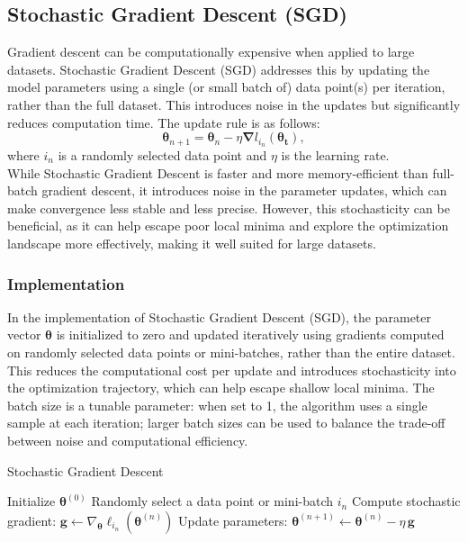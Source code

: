 \documentclass[
 reprint,            %
 amsmath,amssymb,
 aps,
]{revtex4-2}
\begin{document}
\subsection{Stochastic Gradient Descent (SGD)}
Gradient descent can be computationally expensive when applied to large datasets.
Stochastic Gradient Descent (SGD) addresses this by updating the model parameters using a single (or small batch of) data point(s) per iteration, rather than the full dataset\cite{hjorthjensen_week37}.
This introduces noise in the updates but significantly reduces computation time.
The update rule is as follows:  
$$
\boldsymbol{\theta}_{n+1} = \boldsymbol{\theta}_n - {\eta \boldsymbol{\nabla}} l_{i_n} (\boldsymbol{\theta_t}),
$$  
where \(i_n\) is a randomly selected data point and \(\eta\) is the learning rate. \\

While Stochastic Gradient Descent is faster and more memory-efficient than full-batch gradient descent, it introduces noise in the parameter updates, which can make convergence less stable and less precise.
However, this stochasticity can be beneficial, as it can help escape poor local minima and explore the optimization landscape more effectively, making it well suited for large datasets. \cite{hjorthjensen_week37}

\subsubsection{Implementation}

In the implementation of Stochastic Gradient Descent (SGD), the parameter vector $\boldsymbol{\theta}$ is initialized to zero and updated iteratively using gradients computed on randomly selected data points or mini-batches, rather than the entire dataset.
This reduces the computational cost per update and introduces stochasticity into the optimization trajectory, which can help escape shallow local minima. 
The batch size is a tunable parameter: when set to 1, the algorithm uses a single sample at each iteration; larger batch sizes can be used to balance the trade-off between noise and computational efficiency.

\begin{algorithm}[H]
\caption{Stochastic Gradient Descent}
\begin{algorithmic}[1]
\State Initialize $\boldsymbol{\theta}^{(0)}$
    \State Randomly select a data point or mini-batch $i_n$
    \State Compute stochastic gradient: $\mathbf{g} \gets \nabla_{\boldsymbol{\theta}} \ell_{i_n}(\boldsymbol{\theta}^{(n)})$
    \State Update parameters: $\boldsymbol{\theta}^{(n+1)} \gets \boldsymbol{\theta}^{(n)} - \eta \, \mathbf{g}$
\EndFor
\end{algorithmic}
\end{algorithm}
\end{document}
